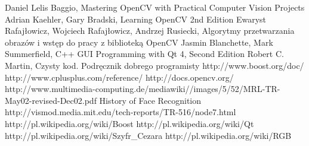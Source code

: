 \documentclass[eng,printmode]{mgr}
\begin{document}
\begin{thebibliography}{18}

 Daniel Lelis Baggio, Mastering OpenCV with Practical Computer Vision Projects
 Adrian Kaehler, Gary Bradski, Learning OpenCV 2nd Edition
  Ewaryst Rafajłowicz, Wojciech Rafajłowicz, Andrzej Rusiecki, Algorytmy przetwarzania obrazów i wstęp do pracy z biblioteką OpenCV
 Jasmin Blanchette, Mark Summerfield, C++ GUI Programming with Qt 4, Second Edition
 Robert C. Martin, Czysty kod. Podręcznik dobrego programisty
 http://www.boost.org/doc/
 http://www.cplusplus.com/reference/
 http://docs.opencv.org/
 http://www.multimedia-computing.de/mediawiki//images/5/52/MRL-TR-May02-revised-Dec02.pdf
 History of Face Recognition http://vismod.media.mit.edu/tech-reports/TR-516/node7.html
 http://pl.wikipedia.org/wiki/Boost
 http://pl.wikipedia.org/wiki/Qt
 http://pl.wikipedia.org/wiki/Szyfr\_Cezara
 http://pl.wikipedia.org/wiki/RGB
\end{thebibliography}

 \listoffigures
\end{document}

